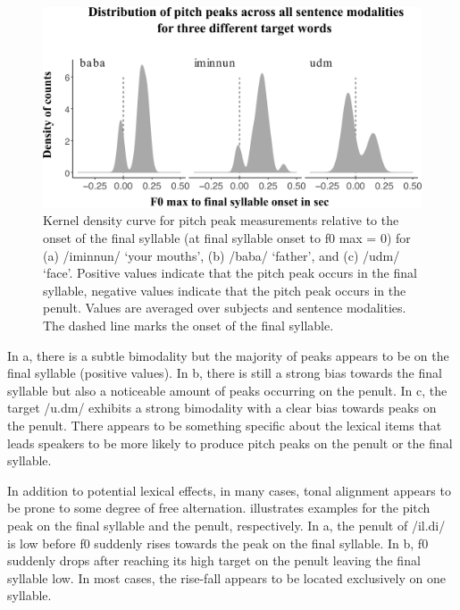   \begin{figure}
  \centering 
   \includegraphics[width=1\textwidth]{figures/Figure_5_8_words.png}
  \caption{Kernel density curve for pitch peak measurements relative to the onset of the final syllable (at final syllable onset to f0 max = 0) for (a) /iminnun/ ‘your mouths’, (b) /baba/ ‘father’, and (c) /udm/ ‘face’. Positive values indicate that the pitch peak occurs in the final syllable, negative values indicate that the pitch peak occurs in the penult. Values are averaged over subjects and sentence modalities. The dashed line marks the onset of the final syllable.}
   \label{fig:5.8}
   \end{figure}

In a, there is a subtle bimodality but the majority of peaks appears to be on the final syllable (positive values). In b, there is still a strong bias towards the final syllable but also a noticeable amount of peaks occurring on the penult. In c, the target /u.dm/ exhibits a strong bimodality with a clear bias towards peaks on the penult. There appears to be something specific about the lexical items that leads speakers to be more likely to produce pitch peaks on the penult or the final syllable. 

\newpage 
In addition to potential lexical effects, in many cases, tonal alignment appears to be prone to some degree of free alternation.  illustrates examples for the pitch peak on the final syllable and the penult, respectively. In a, the penult of /il.di/ is low before f0 suddenly rises towards the peak on the final syllable. In b, f0 suddenly drops after reaching its high target on the penult leaving the final syllable low. In most cases, the rise-fall appears to be located exclusively on one syllable.

